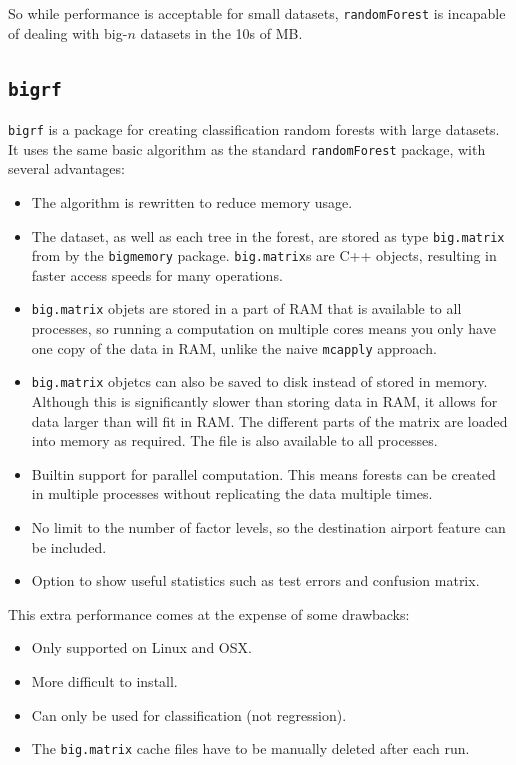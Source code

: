 \documentclass{article}
\begin{document}
So while performance is acceptable for small datasets, \texttt{randomForest} is incapable of dealing with big-$n$ datasets in the 10s of MB.

\FloatBarrier



\subsection{\texttt{bigrf}}
\texttt{bigrf} is a package for creating classification random forests with large datasets. It uses the same basic algorithm as the standard \texttt{randomForest} package, with several advantages:

\begin{itemize}
    \item The algorithm is rewritten to reduce memory usage.
    \item The dataset, as well as each tree in the forest, are stored as type \texttt{big.matrix} from by the \texttt{bigmemory} package. \texttt{big.matrix}s are C++ objects, resulting in faster access speeds for many operations.
    \item \texttt{big.matrix} objets are stored in a part of RAM that is available to all processes, so running a computation on multiple cores means you only have one copy of the data in RAM, unlike the naive \texttt{mcapply} approach. 
    \item \texttt{big.matrix} objetcs can also be saved to disk instead of stored in memory. Although this is significantly slower than storing data in RAM, it allows for data larger than will fit in RAM. The different parts of the matrix are loaded into memory as required. The file is also available to all processes.
    \item Builtin support for parallel computation. This means forests can be created in multiple processes without replicating the data multiple times.
    \item No limit to the number of factor levels, so the destination airport feature can be included.
    \item Option to show useful statistics such as test errors and confusion matrix.
\end{itemize}

This extra performance comes at the expense of some drawbacks:
\begin{itemize}
    \item Only supported on Linux and OSX.
    \item More difficult to install.
    \item Can only be used for classification (not regression).
    \item The \texttt{big.matrix} cache files have to be manually deleted after each run.
\end{itemize}
\end{document}
